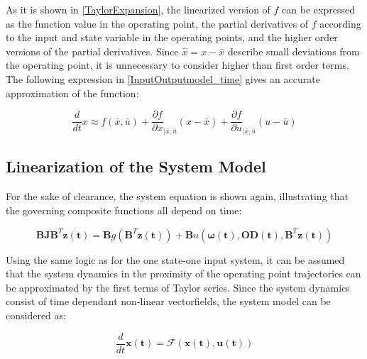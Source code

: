 As it is shown in \eqref{TaylorExpansion}, the linearized version of $f$ can be expressed as the function value in the operating point, the partial derivatives of $f$ according to the input and state variable in the operating points, and the higher order versions of the partial derivatives. Since $\hat{x} = x - \bar{x}$ describe small deviations from the operating point, it is unnecessary to consider higher than first order terms. The following expression in \eqref{InputOutputmodel_time} gives an accurate approximation of the function: 

\begin{equation}
\frac{d}{dt} x \approx f(\bar{x},\bar{u}) + \frac{\partial f}{\partial x}_{|\bar{x}, \bar{u}} (x-\bar{x}) + \frac{\partial f}{\partial u}_{|\bar{x}, \bar{u}} (u-\bar{u}) 
 \label{TaylorExpansion_approx}
\end{equation}

%
%
%
%

\subsection{Linearization of the System Model}
 \label{SystemLin}
 
For the sake of clearance, the system equation is shown again, illustrating that the governing composite functions all depend on time: 

\begin{equation}
 \pmb{B}\pmb{J {B}}^T \pmb{\dot{z(t)}} = \pmb{B} g(\pmb{B}^T \pmb{z(t)})+ \pmb{B} u(\pmb{\omega(t)},\pmb{OD(t)}, \pmb{B}^T \pmb{z(t)})
 \label{InputOutputmodel_time}
\end{equation}

Using the same logic as for the one state-one input system, it can be assumed that the system dynamics in the proximity of the operating point trajectories can be approximated by the first terms of Taylor series. Since the system dynamics consist of time dependant non-linear vectorfields, the system model can be considered as: 

\begin{equation}
\frac{d}{dt} \pmb{x(t)} = \mathcal{F}(\pmb{x(t)},\pmb{u(t)})
 \label{sysfunc_simplified}
\end{equation}

